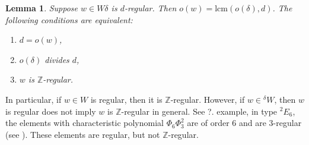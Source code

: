 \documentclass[12pt,leqno]{article}
\newtheorem{lemma}[equation]{Lemma}
\begin{document}
\begin{lemma} Suppose $w\in W\delta$ is $d$-regular.  Then
$o(w)=\text{lcm}(o(\delta),d)$.  The following conditions are
equivalent:
	\begin{enumerate}
		\item $d=o(w)$,
		\item $o(\delta)$ divides $d$,
		\item $w$ is $\mathbb Z$-regular.
	\end{enumerate}
\end{lemma}

In particular, if $w \in W$ is regular, then it is $\mathbb
Z$-regular. However, if $w \in {}^{\delta} W$, then $w$ is regular
does not imply $w$ is $\mathbb Z$-regular in general. See ?. %
example, in type ${}^2 E_6$, the elements with characteristic
polynomial $\Phi_6 \Phi_3^2$ are of order $6$ and are $3$-regular (see
\cite[Table 8]{springer_regular}). These elements are regular, but not $\mathbb
Z$-regular.
\end{document}
